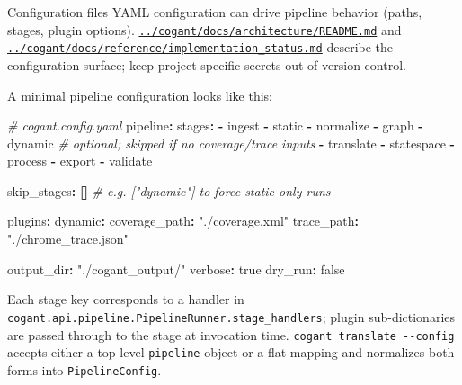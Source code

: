 \documentclass[
  ignorenonframetext,
]{beamer}
\newenvironment{Shaded}{}{}
\newcommand{\AttributeTok}[1]{\textcolor[rgb]{0.49,0.56,0.16}{#1}}
\newcommand{\CharTok}[1]{\textcolor[rgb]{0.25,0.44,0.63}{#1}}
\newcommand{\CommentTok}[1]{\textcolor[rgb]{0.38,0.63,0.69}{\textit{#1}}}
\newcommand{\FunctionTok}[1]{\textcolor[rgb]{0.02,0.16,0.49}{#1}}
\newcommand{\KeywordTok}[1]{\textcolor[rgb]{0.00,0.44,0.13}{\textbf{#1}}}
\newcommand{\StringTok}[1]{\textcolor[rgb]{0.25,0.44,0.63}{#1}}
\begin{document}
\begin{frame}[fragile]{Configuration files}
\protect{}\label{configuration-files}
YAML configuration can drive pipeline behavior (paths, stages, plugin
options).
\href{../cogant/docs/architecture/README.md}{\texttt{../cogant/docs/architecture/README.md}}
and
\href{../cogant/docs/reference/implementation_status.md}{\texttt{../cogant/docs/reference/implementation\_status.md}}
describe the configuration surface; keep project-specific secrets out of
version control.

A minimal pipeline configuration looks like this:

\begin{Shaded}
\begin{Highlighting}[]
\CommentTok{\# cogant.config.yaml}
\FunctionTok{pipeline}\KeywordTok{:}
\AttributeTok{  }\FunctionTok{stages}\KeywordTok{:}
\AttributeTok{    }\KeywordTok{{-}}\AttributeTok{ ingest}
\AttributeTok{    }\KeywordTok{{-}}\AttributeTok{ static}
\AttributeTok{    }\KeywordTok{{-}}\AttributeTok{ normalize}
\AttributeTok{    }\KeywordTok{{-}}\AttributeTok{ graph}
\AttributeTok{    }\KeywordTok{{-}}\AttributeTok{ dynamic}\CommentTok{       \# optional; skipped if no coverage/trace inputs}
\AttributeTok{    }\KeywordTok{{-}}\AttributeTok{ translate}
\AttributeTok{    }\KeywordTok{{-}}\AttributeTok{ statespace}
\AttributeTok{    }\KeywordTok{{-}}\AttributeTok{ process}
\AttributeTok{    }\KeywordTok{{-}}\AttributeTok{ export}
\AttributeTok{    }\KeywordTok{{-}}\AttributeTok{ validate}

\AttributeTok{  }\FunctionTok{skip\_stages}\KeywordTok{:}\AttributeTok{ }\KeywordTok{[]}\CommentTok{   \# e.g. ["dynamic"] to force static{-}only runs}

\AttributeTok{  }\FunctionTok{plugins}\KeywordTok{:}
\AttributeTok{    }\FunctionTok{dynamic}\KeywordTok{:}
\AttributeTok{      }\FunctionTok{coverage\_path}\KeywordTok{:}\AttributeTok{ }\StringTok{"./coverage.xml"}
\AttributeTok{      }\FunctionTok{trace\_path}\KeywordTok{:}\AttributeTok{ }\StringTok{"./chrome\_trace.json"}

\AttributeTok{  }\FunctionTok{output\_dir}\KeywordTok{:}\AttributeTok{ }\StringTok{"./cogant\_output/"}
\AttributeTok{  }\FunctionTok{verbose}\KeywordTok{:}\AttributeTok{ }\CharTok{true}
\AttributeTok{  }\FunctionTok{dry\_run}\KeywordTok{:}\AttributeTok{ }\CharTok{false}
\end{Highlighting}
\end{Shaded}

Each stage key corresponds to a handler in
\texttt{cogant.api.pipeline.PipelineRunner.stage\_handlers}; plugin
sub-dictionaries are passed through to the stage at invocation time.
\texttt{cogant\ translate\ -\/-config} accepts either a top-level
\texttt{pipeline} object or a flat mapping and normalizes both forms
into \texttt{PipelineConfig}.
\end{frame}
\end{document}

